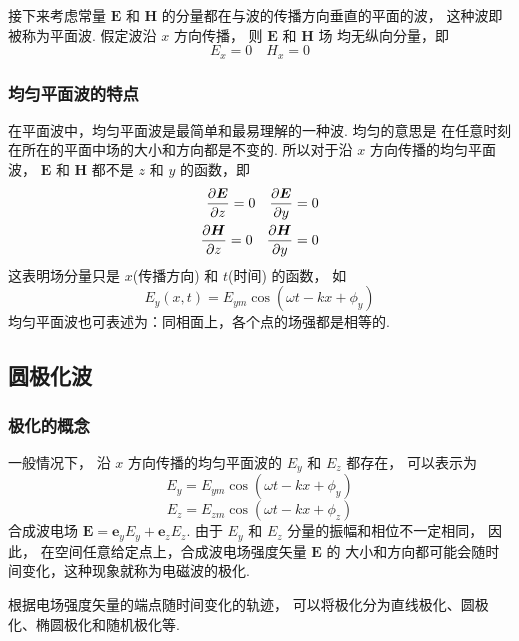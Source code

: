 \documentclass[UTF8,linespread=1.236]{ctexart}
\newcommand\cu[1]{\boldsymbol{#1}}
\newcommand\vecE{\cu{E}}
\newcommand\vecH{\cu{H}}
\newcommand\pypx[2]{{{\partial {#1}} \over {\partial {#2}}}}
\begin{document}
接下来考虑常量 $\vecE$ 和 $\vecH$ 的分量都在与波的传播方向垂直的平面的波，
这种波即被称为平面波.
假定波沿 $x$ 方向传播，
则 $\vecE$ 和 $\vecH$ 场
均无纵向分量，即
\begin{equation*}
    E_x = 0 \quad H_x = 0
\end{equation*}

\subsubsection{均匀平面波的特点}
在平面波中，均匀平面波是最简单和最易理解的一种波.
均匀的意思是
在任意时刻在所在的平面中场的大小和方向都是不变的.
所以对于沿 $x$ 方向传播的均匀平面波，
$\vecE$ 和 $\vecH$ 都不是 $z$ 和 $y$ 的函数，即
\begin{equation} \label{eqpmb}
\begin{aligned}
    \pypx{\vecE}{z} = 0 \quad \pypx{\vecE}{y} = 0 \\
    \pypx{\vecH}{z} = 0 \quad \pypx{\vecH}{y} = 0
\end{aligned}
\end{equation}
这表明场分量只是 $x$(传播方向) 和 $t$(时间) 的函数，
如
\begin{equation}
    E_y(x,t) = E_{ym}\cos{(\omega t - kx + \phi_y)}
\end{equation}
均匀平面波也可表述为：同相面上，各个点的场强都是相等的.

\subsection{圆极化波}

\subsubsection{极化的概念}
\newcommand\phase[1]{\omega t - kx + \phi_{#1}}
一般情况下，
沿 $x$ 方向传播的均匀平面波的 $E_y$ 和 $E_z$ 都存在，
可以表示为
\begin{equation}
    E_y = E_{ym}\cos{(\phase{y})}
\end{equation}
\begin{equation}
    E_z = E_{zm}\cos{(\phase{z})}
\end{equation}
合成波电场 $\vecE = \cu{e}_yE_y + \cu{e}_zE_z$.
由于 $E_y$ 和 $E_z$ 分量的振幅和相位不一定相同，
因此，
在空间任意给定点上，合成波电场强度矢量 $\vecE$ 的
大小和方向都可能会随时间变化，这种现象就称为电磁波的极化.

根据电场强度矢量的端点随时间变化的轨迹，
可以将极化分为直线极化、圆极化、椭圆极化和随机极化等.
\end{document}
